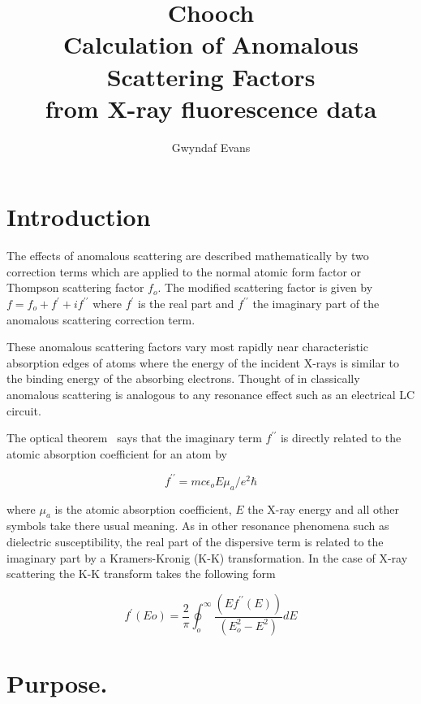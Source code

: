\documentclass[a4]{article}
\begin{document}
\title{{\bf \sc Chooch} \\
Calculation of Anomalous Scattering Factors \\
from X-ray fluorescence data}
\author{Gwyndaf Evans}
\maketitle

\section{Introduction}

The effects of anomalous scattering are described mathematically by
two correction terms which are applied to the normal atomic form
factor or Thompson scattering factor $f_{o}$. The modified scattering
factor is given by $f = f_{o} + f^{\prime} + if^{\prime\prime}$ where
$f^{\prime}$ is the real part and $f^{\prime\prime}$ the imaginary
part of the anomalous scattering correction term.

These anomalous scattering factors vary most rapidly near
characteristic absorption edges of atoms where the energy of the
incident X-rays is similar to the binding energy of the absorbing
electrons. Thought of in classically anomalous scattering is analogous
to any resonance effect such as an electrical LC circuit. 

The optical theorem~\cite{James} says that the imaginary term
$f^{\prime\prime}$ is directly related to the atomic absorption
coefficient for an atom by

\begin{equation}
f^{\prime\prime} = mc \epsilon_{o}E\mu_{a}/e^{2}\hbar
\end{equation}

where $\mu_{a}$ is the atomic absorption coefficient, $E$ the X-ray
energy and all other symbols take there usual meaning. As in other
resonance phenomena such as dielectric susceptibility, the real part
of the dispersive term is related to the imaginary part by a
Kramers-Kronig (K-K) transformation. In the case of X-ray scattering
the K-K transform takes the following form

\begin{equation}
f^{\prime}(Eo)= \frac{2}{\pi}\oint_{o}^{\infty}
                \frac{(E f^{\prime\prime}(E))}{(E_{o}^{2} - E^{2})}dE 
\label{KK}
\end{equation}

\section{Purpose.}
\end{document}
